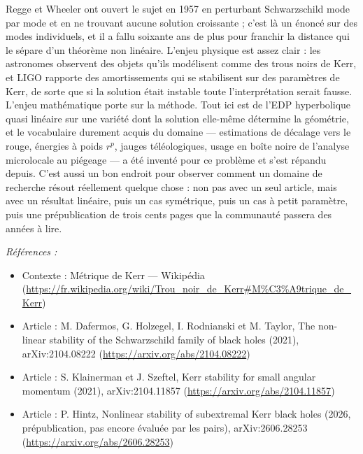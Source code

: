\documentclass[11pt]{article}
\newenvironment{refs}{\par\small\noindent\emph{Références :}\begin{itemize}\setlength\itemsep{0pt}}{\end{itemize}\normalsize}
\begin{document}
\noindent Regge et Wheeler ont ouvert le sujet en 1957 en perturbant Schwarzschild mode
par mode et en ne trouvant aucune solution croissante ; c'est là un énoncé sur des modes
individuels, et il a fallu soixante ans de plus pour franchir la distance qui le sépare d'un
théorème non linéaire. L'enjeu physique est assez clair : les astronomes observent des objets
qu'ils modélisent comme des trous noirs de Kerr, et LIGO rapporte des amortissements qui se
stabilisent sur des paramètres de Kerr, de sorte que si la solution était instable toute
l'interprétation serait fausse. L'enjeu mathématique porte sur la méthode. Tout ici est de l'EDP
hyperbolique quasi linéaire sur une variété dont la solution elle-même détermine la géométrie, et
le vocabulaire durement acquis du domaine --- estimations de décalage vers le rouge, énergies à poids
$ r^{p} $, jauges téléologiques, usage en boîte noire de l'analyse microlocale au piégeage --- a
été inventé pour ce problème et s'est répandu depuis. C'est aussi un bon endroit pour observer
comment un domaine de recherche résout réellement quelque chose : non pas avec un seul article,
mais avec un résultat linéaire, puis un cas symétrique, puis un cas à petit paramètre, puis une
prépublication de trois cents pages que la communauté passera des années à lire.

\begin{refs}
\item Contexte : Métrique de Kerr --- Wikipédia (\url{https://fr.wikipedia.org/wiki/Trou_noir_de_Kerr#M%C3%A9trique_de_Kerr})
\item Article : M. Dafermos, G. Holzegel, I. Rodnianski et M. Taylor, \og{} The non-linear stability of the Schwarzschild family of black holes \fg{} (2021), arXiv:2104.08222 (\url{https://arxiv.org/abs/2104.08222})
\item Article : S. Klainerman et J. Szeftel, \og{} Kerr stability for small angular momentum \fg{} (2021), arXiv:2104.11857 (\url{https://arxiv.org/abs/2104.11857})
\item Article : P. Hintz, \og{} Nonlinear stability of subextremal Kerr black holes \fg{} (2026, prépublication, pas encore évaluée par les pairs), arXiv:2606.28253 (\url{https://arxiv.org/abs/2606.28253})
\end{refs}

\bigskip
\end{document}
